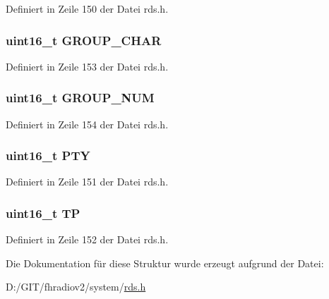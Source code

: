 Definiert in Zeile 150 der Datei rds.\+h.

\hypertarget{structblock__b_a66d4119990dc4c3e040a43885e9bb953}{}
\subsubsection[{G\+R\+O\+U\+P\+\_\+\+C\+H\+A\+R}]{\setlength{\rightskip}{0pt plus 5cm}uint16\+\_\+t G\+R\+O\+U\+P\+\_\+\+C\+H\+A\+R}\label{structblock__b_a66d4119990dc4c3e040a43885e9bb953}


Definiert in Zeile 153 der Datei rds.\+h.

\hypertarget{structblock__b_a9f692e9f76ee88348d426bcd4e9bc70b}{}
\subsubsection[{G\+R\+O\+U\+P\+\_\+\+N\+U\+M}]{\setlength{\rightskip}{0pt plus 5cm}uint16\+\_\+t G\+R\+O\+U\+P\+\_\+\+N\+U\+M}\label{structblock__b_a9f692e9f76ee88348d426bcd4e9bc70b}


Definiert in Zeile 154 der Datei rds.\+h.

\hypertarget{structblock__b_a0474967478fbbc2c71b800d2e0132d45}{}
\subsubsection[{P\+T\+Y}]{\setlength{\rightskip}{0pt plus 5cm}uint16\+\_\+t P\+T\+Y}\label{structblock__b_a0474967478fbbc2c71b800d2e0132d45}


Definiert in Zeile 151 der Datei rds.\+h.

\hypertarget{structblock__b_ab9e634c63b0d95a96716d5f6d7f06d72}{}
\subsubsection[{T\+P}]{\setlength{\rightskip}{0pt plus 5cm}uint16\+\_\+t T\+P}\label{structblock__b_ab9e634c63b0d95a96716d5f6d7f06d72}


Definiert in Zeile 152 der Datei rds.\+h.



Die Dokumentation für diese Struktur wurde erzeugt aufgrund der Datei\+:\begin{DoxyCompactItemize}
\item 
D\+:/\+G\+I\+T/fhradiov2/system/\hyperlink{rds_8h}{rds.\+h}\end{DoxyCompactItemize}

